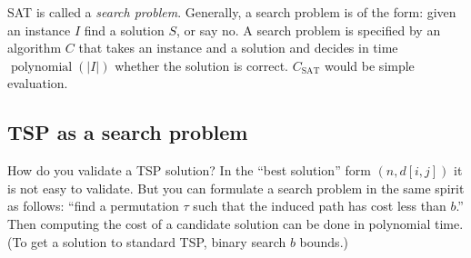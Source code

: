 SAT is called a \emph{search problem}. Generally, a search problem is of the form: given an instance \(I\) find a solution \(S\), or say no. A search problem is specified by an algorithm \(C\) that takes an instance and a solution and decides in time \(\operatorname{polynomial}\left(\left|I\right|\right)\) whether the solution is correct. \(C_\text{SAT}\) would be simple evaluation.
\subsection{TSP as a search problem}
How do you validate a TSP solution? In the ``best solution'' form \(\left(n, d[i,j]\right)\) it is not easy to validate.
But you can formulate a search problem in the same spirit as follows: ``find a permutation \(\tau\) such that the induced path has cost less than \(b\).'' Then computing the cost of a candidate solution can be done in polynomial time. (To get a solution to standard TSP, binary search \(b\) bounds.)